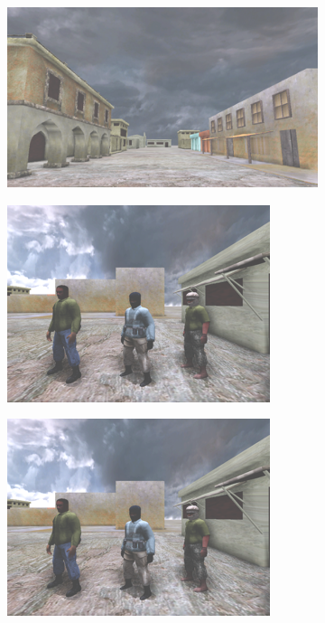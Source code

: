 \documentclass[final]{article}
\begin{document}
\begin{figure}[!htbp]
\centering
\begin{subfigure}[t]{0.3\textwidth}
\centering
\includegraphics[width=\textwidth]{figures/stimulus-movement}
\caption{}
\label{fig:stimulus-movement}
\end{subfigure}
\begin{subfigure}[t]{0.3\textwidth}
\centering
\includegraphics[width=\textwidth]{figures/stimulus-characters}
\caption{}
\label{fig:stimulus-characters}
\end{subfigure}
\begin{subfigure}[t]{0.3\textwidth}
\centering
\includegraphics[width=\textwidth]{figures/stimulus-location}

\end{subfigure}
\end{figure}
\end{document}
